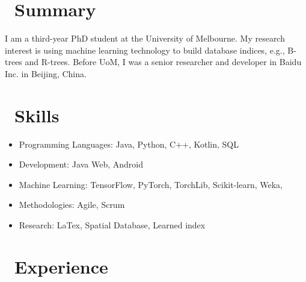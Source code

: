 \documentclass{resume}
\begin{document}



{\color{red}
\section{\faPencilSquare\ Summary}
I am a third-year PhD student at the University of Melbourne. My research interest is using machine learning
technology to build database indices, e.g., B-trees and R-trees. Before UoM, I was a senior
researcher and developer in Baidu Inc. in Beijing, China.
}

\section{\faCogs\ Skills}
\begin{itemize}[parsep=0.5ex]
  \item Programming Languages: Java, Python, C++, Kotlin, SQL
  \item Development: Java Web, Android
  \item Machine Learning: TensorFlow, PyTorch, TorchLib, Scikit-learn, Weka,
  \item Methodologies: Agile, Scrum
  \item Research: LaTex, Spatial Database, Learned index

  
\end{itemize}

\section{\faUsers\ Experience}
\end{document}
